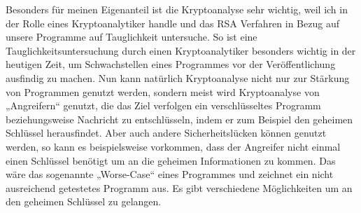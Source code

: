 Besonders für meinen Eigenanteil ist die Kryptoanalyse sehr wichtig, weil ich in der Rolle eines Kryptoanalytiker handle und das RSA Verfahren in Bezug auf unsere Programme auf Tauglichkeit untersuche. So ist eine Tauglichkeitsuntersuchung durch einen Kryptoanalytiker besonders wichtig in der heutigen Zeit, um Schwachstellen eines Programmes vor der Veröffentlichung ausfindig zu machen. Nun kann natürlich Kryptoanalyse nicht nur zur Stärkung von Programmen genutzt werden, sondern meist wird Kryptoanalyse von „Angreifern“ genutzt, die das Ziel verfolgen ein verschlüsseltes Programm beziehungsweise Nachricht zu entschlüsseln, indem er zum Beispiel den geheimen Schlüssel herausfindet. Aber auch andere Sicherheitslücken können genutzt werden, so kann es beispielsweise vorkommen, dass der Angreifer nicht einmal einen Schlüssel benötigt um an die geheimen Informationen zu kommen. Das wäre das sogenannte „Worse-Case“ eines Programmes und zeichnet ein nicht ausreichend getestetes Programm aus. Es gibt verschiedene Möglichkeiten um an den geheimen Schlüssel zu gelangen.\\


